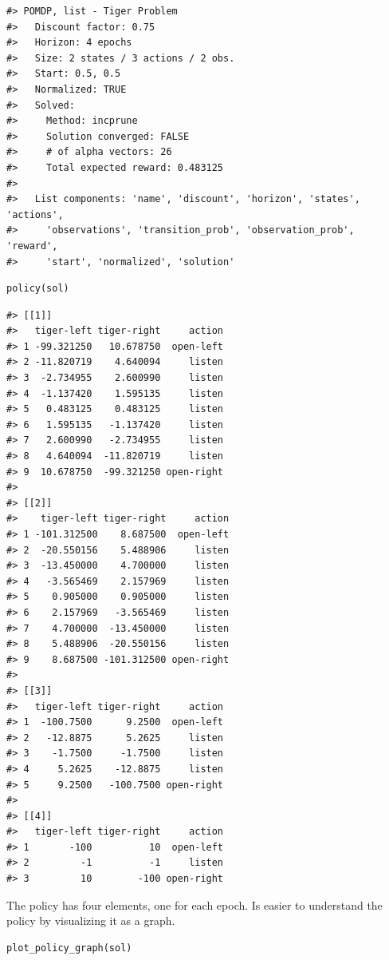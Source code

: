 \begin{verbatim}
#> POMDP, list - Tiger Problem
#>   Discount factor: 0.75
#>   Horizon: 4 epochs
#>   Size: 2 states / 3 actions / 2 obs.
#>   Start: 0.5, 0.5
#>   Normalized: TRUE
#>   Solved:
#>     Method: incprune
#>     Solution converged: FALSE
#>     # of alpha vectors: 26
#>     Total expected reward: 0.483125
#> 
#>   List components: 'name', 'discount', 'horizon', 'states', 'actions',
#>     'observations', 'transition_prob', 'observation_prob', 'reward',
#>     'start', 'normalized', 'solution'
\end{verbatim}

\begin{verbatim}
policy(sol)
\end{verbatim}

\begin{verbatim}
#> [[1]]
#>   tiger-left tiger-right     action
#> 1 -99.321250   10.678750  open-left
#> 2 -11.820719    4.640094     listen
#> 3  -2.734955    2.600990     listen
#> 4  -1.137420    1.595135     listen
#> 5   0.483125    0.483125     listen
#> 6   1.595135   -1.137420     listen
#> 7   2.600990   -2.734955     listen
#> 8   4.640094  -11.820719     listen
#> 9  10.678750  -99.321250 open-right
#> 
#> [[2]]
#>    tiger-left tiger-right     action
#> 1 -101.312500    8.687500  open-left
#> 2  -20.550156    5.488906     listen
#> 3  -13.450000    4.700000     listen
#> 4   -3.565469    2.157969     listen
#> 5    0.905000    0.905000     listen
#> 6    2.157969   -3.565469     listen
#> 7    4.700000  -13.450000     listen
#> 8    5.488906  -20.550156     listen
#> 9    8.687500 -101.312500 open-right
#> 
#> [[3]]
#>   tiger-left tiger-right     action
#> 1  -100.7500      9.2500  open-left
#> 2   -12.8875      5.2625     listen
#> 3    -1.7500     -1.7500     listen
#> 4     5.2625    -12.8875     listen
#> 5     9.2500   -100.7500 open-right
#> 
#> [[4]]
#>   tiger-left tiger-right     action
#> 1       -100          10  open-left
#> 2         -1          -1     listen
#> 3         10        -100 open-right
\end{verbatim}

The policy has four elements, one for each epoch. Is easier to understand the
policy by visualizing it as a graph.

\begin{verbatim}
plot_policy_graph(sol)
\end{verbatim}

